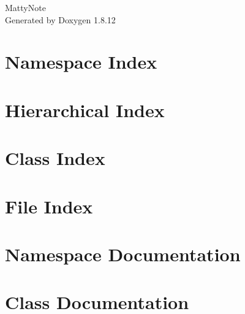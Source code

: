 \documentclass[twoside]{book}
\newcommand{\+}{\discretionary{\mbox{\scriptsize$\hookleftarrow$}}{}{}}
\newcommand{\clearemptydoublepage}{%
  \newpage{\pagestyle{empty}\cleardoublepage}%
}
\begin{document}
\hypersetup{pageanchor=false,
             bookmarksnumbered=true,
             pdfencoding=unicode
            }
\begin{titlepage}
\vspace*{7cm}
\begin{center}%
{\Large Matty\+Note }\\
\vspace*{1cm}
{\large Generated by Doxygen 1.8.12}\\
\end{center}
\end{titlepage}
\clearemptydoublepage
{}
\tableofcontents
\clearemptydoublepage
{}
\hypersetup{pageanchor=true}

\chapter{Namespace Index}

\chapter{Hierarchical Index}

\chapter{Class Index}

\chapter{File Index}

\chapter{Namespace Documentation}

\chapter{Class Documentation}





















\end{document}
